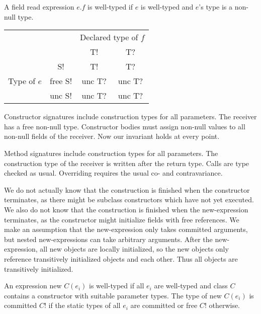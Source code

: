 \begin{mytitle} A field read expression $e.f$ is well-typed if $e$ is well-typed and $e$'s type is a non-null type. 
\begin{center}
\begin{tabular}{c c|c c}
    & & \multicolumn{2}{c}{Declared type of $f$}\\
    & & T! & T? \\
    \hline
    \multirow{3}{*}{Type of $e$} & S! & T! & T?\\
    & free S! & unc T? & unc T?\\
    & unc S! & unc T? & unc T?\\
\end{tabular}
\end{center}
\end{mytitle}
\begin{mytitle} Constructor signatures include construction types for all parameters. The receiver has a free non-null type. Constructor bodies must assign non-null values to all non-null fields of the receiver. Now our invariant holds at every point.
\end{mytitle}
\begin{mytitle} Method signatures include construction types for all parameters. The construction type of the receiver is written after the return type. Calls are type checked as usual. Overriding requires the usual co- and contravariance.
\end{mytitle}
\begin{mytitle} We do not actually know that the construction is finished when the constructor terminates, as there might be subclass constructors which have not yet executed. We also do not know that the construction is finished when the new-expression terminates, as the constructor might initialize fields with free references. We make an assumption that the new-expression only takes committed arguments, but nested new-expressions can take arbitrary arguments. After the new-expression, all new objects are locally initialized, so the new objects only reference transitively initialized objects and each other. Thus all objects are transitively initialized.
\end{mytitle}
\begin{mytitle} An expression new $C(e_i)$ is well-typed if all $e_i$ are well-typed and class $C$ contains a constructor with suitable parameter types. The type of new $C(e_i)$ is committed $C!$ if the static types of all $e_i$ are committed or free $C!$ otherwise.
\end{mytitle}
